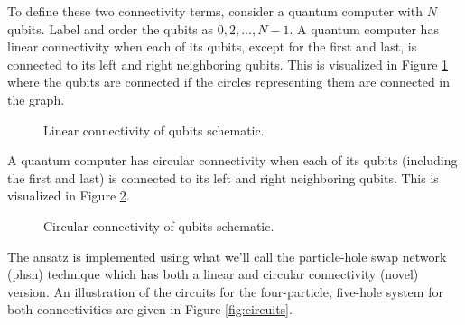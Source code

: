 \documentclass[Dual]{msu-thesis}
\begin{document}
To define these two connectivity terms, consider a quantum computer with $N$ qubits. Label and order the qubits as $0,2,...,N-1$.
A quantum computer has linear connectivity when each of its qubits, except for the first and last, is connected to its left and right neighboring qubits.
This is visualized in Figure \ref{fig:linear_con} where the qubits are connected if the circles representing them are connected in the graph.
\begin{figure}
\centering
{} 
\caption{Linear connectivity of qubits schematic.}
\label{fig:linear_con}
\end{figure}
A quantum computer has circular connectivity when each of its qubits (including the first and last) is connected to its left and right neighboring qubits. This is visualized in Figure \ref{fig:circular_con}.
\begin{figure}
\centering
{}   
\caption{Circular connectivity of qubits schematic.}
\label{fig:circular_con}
\end{figure}
The ansatz is implemented using what we'll call the particle-hole swap network (phsn) technique which has both a linear \cite{ref:phsn} and circular connectivity (novel) version. An illustration of the circuits for the four-particle, five-hole system for both connectivities are given in Figure \ref{fig:circuits}.
\end{document}
